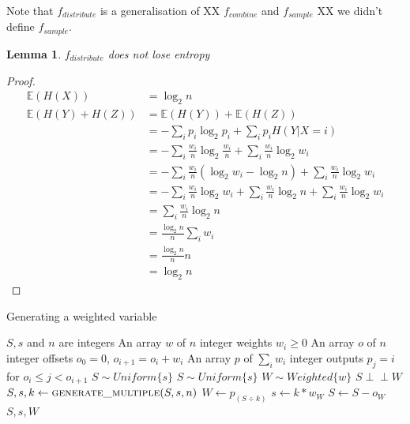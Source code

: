 \documentclass[12pt]{article}
\newtheorem{lemma}{Lemma}
\newcommand{\indep}{\perp\!\!\!\perp}
\begin{document}
Note that $f_{distribute}$ is a generalisation of XX $f_{combine}$ and $f_{sample}$ XX we didn't define $f_{sample}$.

\begin{lemma}
    \label{lem:distribution-conservation}
    $f_{distribute}$ does not lose entropy
\end{lemma}

\begin{proof}
    \begin{align}
    \mathbb{E}(H(X)) & = \log_2 n \\
    \mathbb{E}(H(Y) + H(Z)) &=  \mathbb{E}(H(Y)) + \mathbb{E}(H(Z)) \\
               & = - \sum_i p_i \log_2p_i + \sum_i p_iH(Y|X=i) \\
               & = - \sum_i \frac{w_i}{n} \log_2 \frac{w_i}{n} + \sum_i \frac{w_i}{n}\log_2 w_i \\
               & = - \sum_i \frac{w_i}{n}(\log_2 w_i - \log_2 n) + \sum_i \frac{w_i}{n}\log_2 w_i \\
               & = - \sum_i \frac{w_i}{n}\log_2 w_i + \sum_i \frac{w_i}{n} \log_2 n + \sum_i \frac{w_i}{n}\log_2 w_i \\
               & = \sum_i \frac{w_i}{n} \log_2 n \\
               & = \frac{\log_2 n}{n} \sum_i w_i \\
               & = \frac{\log_2 n}{n} n \\
               & = \log_2 n
    \end{align}
\end{proof}

\begin{algorithm}
\caption{Generating a weighted variable}
\label{alg:generate-weighted}
\begin{algorithmic}[1]
\Require $S, s$ and $n$ are integers
\Require An array $w$ of $n$ integer weights $w_i \ge 0$
\Require An array $o$ of $n$ integer offsets $o_0 = 0$, $o_{i+1} = o_i + w_i$
\Require An array $p$ of $\sum_i w_i$ integer outputs $p_j = i$ for $o_i \le j < o_{i+1}$
\Require $S \sim Uniform\{s\}$
\Ensure $S \sim Uniform\{s\}$
\Ensure $W \sim Weighted\{w\}$
\Ensure $S \indep W$
    \State $S, s, k \gets \textsc{generate\_multiple}(S, s, n)$
    \State $W \gets p_{(S \div k)}$
    \State $s \gets k * w_W$
    \State $S \gets S - o_W$ 
    \State \Return $S, s, W$
\EndProcedure
\end{algorithmic}
\end{algorithm}
\end{document}
